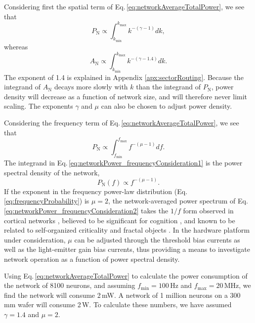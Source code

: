 \documentclass[twocolumn]{article}
\begin{document}
Considering first the spatial term of Eq.\,\ref{eq:networkAverageTotalPower}, we see that 
\begin{equation}
\label{eq:networkPower_spatialConsideration1}
P_{\mathrm{N}} \propto \int_{k_{\mathrm{min}}}^{k_{\mathrm{max}}} k^{-(\gamma-1)}dk, 
\end{equation}
whereas
\begin{equation}
\label{eq:networkPower_spatialConsideration2}
A_{\mathrm{N}} \propto \int_{k_{\mathrm{min}}}^{k_{\mathrm{max}}} k^{-(\gamma-1.4)}dk. 
\end{equation}
The exponent of 1.4 is explained in Appendix \ref{apx:sectorRouting}. Because the integrand of $A_{\mathrm{N}}$ decays more slowly with $k$ than the integrand of $P_{\mathrm{N}}$, power density will decrease as a function of network size, and will therefore never limit scaling. The exponents $\gamma$ and $\mu$ can also be chosen to adjust power density.

Considering the frequency term of Eq.\,\ref{eq:networkAverageTotalPower}, we see that 
\begin{equation}
\label{eq:networkPower_frequencyConsideration1}
P_{\mathrm{N}} \propto \int_{f_{\mathrm{min}}}^{f_{\mathrm{max}}} f^{-(\mu-1)}df. 
\end{equation}
The integrand in Eq.\,\ref{eq:networkPower_frequencyConsideration1} is the power spectral density of the network, 
\begin{equation}
\label{eq:networkPower_frequencyConsideration2}
P_{\mathrm{N}}(f) \propto f^{-(\mu-1)}. 
\end{equation}
If the exponent in the frequency power-law distribution (Eq.\,\ref{eq:frequencyProbability}) is $\mu = 2$, the network-averaged power spectrum of Eq. \ref{eq:networkPower_frequencyConsideration2} takes the $1/f$ form observed in cortical networks \cite{budr2004}, believed to be significant for cognition \cite{bu2006}, and known to be related to self-organized criticality and fractal objects \cite{be2007,bata1987,yara2017}. In the hardware platform under consideration, $\mu$ can be adjusted through the threshold bias currents as well as the light-emitter gain bias currents, thus providing a means to investigate network operation as a function of power spectral density.

Using Eq.\,\ref{eq:networkAverageTotalPower} to calculate the power consumption of the network of 8100 neurons, and assuming $f_{\mathrm{min}} = 100$\,Hz and $f_{\mathrm{max}} = 20$\,MHz, we find the network will consume 2\,mW. A network of 1 million neurons on a 300\,mm wafer will consume 2\,W. To calculate these numbers, we have assumed $\gamma = 1.4$ and $\mu  = 2$.



\end{document}
